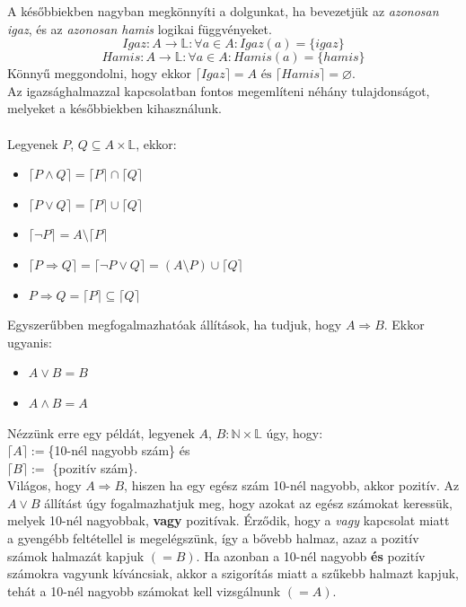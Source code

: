 \documentclass[12pt]{article}
\begin{document}
A későbbiekben nagyban megkönnyíti a dolgunkat, ha bevezetjük az \textit{azonosan igaz}, és az \textit{azonosan hamis} logikai függvényeket.
$$Igaz: A \rightarrow \mathbb{L}: \forall a \in A: Igaz(a) = \{igaz\} $$
$$Hamis: A \rightarrow \mathbb{L}: \forall a \in A: Hamis(a) = \{hamis\} $$
Könnyű meggondolni, hogy ekkor $\lceil Igaz \rceil = A \text{ és } \lceil Hamis \rceil = \varnothing $.\\
Az igazsághalmazzal kapcsolatban fontos megemlíteni néhány tulajdonságot, melyeket a későbbiekben kihasználunk.\\
\\
Legyenek $P$, $Q \subseteq A \times \mathbb{L}$, ekkor:
\begin{itemize}
	\item $ \lceil P \land Q \rceil = \lceil P \rceil \cap \lceil Q \rceil $
	\item $ \lceil P \lor Q \rceil = \lceil P \rceil \cup \lceil Q \rceil  $
	\item $	\lceil \neg P \rceil = A \setminus \lceil P \rceil  $
	\item $\lceil P \Rightarrow Q \rceil = \lceil \neg P \lor Q \rceil = (A \setminus P) \cup \lceil Q \rceil $
	\item $ P \Rightarrow Q = \lceil P \rceil \subseteq \lceil Q \rceil $
\end{itemize}

Egyszerűbben megfogalmazhatóak állítások, ha tudjuk, hogy $A \Rightarrow B$. Ekkor ugyanis:
\begin{itemize}
	\item $A \lor B = B$
	\item $A \land B = A$
\end{itemize}
Nézzünk erre egy példát, legyenek $A$, $B: \mathbb{N} \times \mathbb{L}$ úgy, hogy:\\
$\lceil A \rceil := $\{10-nél nagyobb szám\} és\\
$\lceil B \rceil := $ \{pozitív szám\}.\\
Világos, hogy $A \Rightarrow B$, hiszen ha egy egész szám 10-nél nagyobb, akkor pozitív.
Az $A \lor B$ állítást úgy fogalmazhatjuk meg, hogy azokat az egész számokat keressük, melyek 10-nél nagyobbak, \textbf{vagy} pozitívak. Érződik, hogy a \textit{vagy} kapcsolat miatt a gyengébb feltétellel is megelégszünk, így a bővebb halmaz, azaz a pozitív számok halmazát kapjuk $(=B)$. Ha azonban a 10-nél nagyobb \textbf{és} pozitív számokra vagyunk kíváncsiak, akkor a szigorítás miatt a szűkebb halmazt kapjuk, tehát a 10-nél nagyobb számokat kell vizsgálnunk $(=A)$.
\newpage
\end{document}
